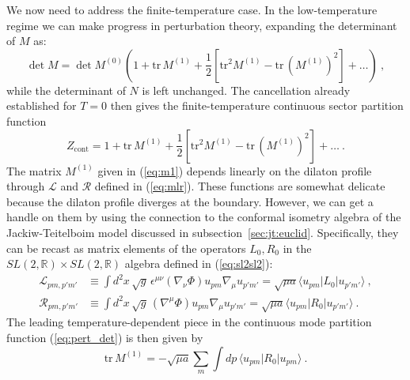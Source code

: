 \documentclass[12pt]{article}
\begin{document}
We now need to address the finite-temperature case. In the low-temperature regime we can make progress in perturbation theory, expanding the determinant of $M$ as:
\begin{equation}
	\det M = \det M^{(0)}\left(1 + \text{tr}\,M^{(1)} + \frac{1}{2}\left[\text{tr}^2M^{(1)} - \text{tr}\,(M^{(1)})^2 \right] + \ldots \right)~,
\end{equation}
while the determinant of $N$ is left unchanged.  The cancellation already established for $T=0$ then gives the finite-temperature continuous sector partition function
\begin{equation}
	Z_\text{cont} = 1 + \text{tr}\,M^{(1)} + \frac{1}{2}\left[\text{tr}^2M^{(1)} - \text{tr}\,(M^{(1)})^2 \right] + \ldots~.
\label{eq:pert_det}
\end{equation}
The matrix $M^{(1)}$ given in (\ref{eq:m1}) depends linearly on the dilaton profile through $\mathcal{L}$ and $\mathcal{R}$ defined in (\ref{eq:mlr}).  These functions are somewhat delicate because the dilaton profile diverges at the boundary.  However, we can get a handle on them by using the connection to the conformal isometry algebra of the Jackiw-Teitelboim model discussed in subsection~\ref{sec:jt:euclid}.  Specifically, they can be recast as matrix elements of the operators $L_0, R_0$ in the $SL(2,\mathbb{R}) \times SL(2,\mathbb{R})$ algebra defined in (\ref{eq:sl2sl2}):
\begin{equation}\begin{aligned}
	\mathcal{L}_{p m,p' m'} &\equiv \int d^2x\,\sqrt{g}\,\epsilon^{\mu\nu}\left(\nabla_\nu \Phi\right) u_{pm} \nabla_\mu u_{p'm'} = \sqrt{\mu a}\langle u_{p m}| L_0 | u_{p' m'}\rangle~, \\
	\mathcal{R}_{p m,p' m'} &\equiv \int d^2x\,\sqrt{g}\,\left(\nabla^\mu \Phi\right) u_{pm} \nabla_\mu u_{p'm'} = \sqrt{\mu a}\langle u_{p m}| R_0 | u_{p' m'}\rangle~.
\label{eq:matrixelems}
\end{aligned}\end{equation}
The leading temperature-dependent piece in the continuous mode partition function (\ref{eq:pert_det}) is then given by
\begin{equation}
	\text{tr}\, M^{(1)} = -\sqrt{\mu a} \sum_m \int dp\, \langle u_{pm} | R_0 | u_{pm}\rangle~.
\label{eq:trm1}
\end{equation}
\end{document}
